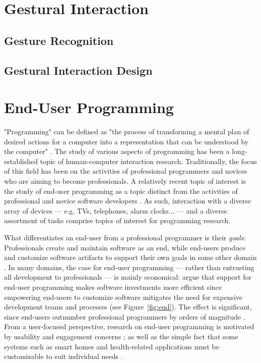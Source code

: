 \section{Gestural Interaction}

\subsection{Gesture Recognition}

\subsection{Gestural Interaction Design}

\section{End-User Programming}
\label{sec:end-user-programming}

"Programming" can be defined as "the process of transforming a mental plan of desired actions for a computer into a representation that can be understood by the computer" \parencite{Myers:2006}. The study of various aspects of programming has been a long-established topic of human-computer interaction research. Traditionally, the focus of this field has been on the activities of professional programmers and novices who are aiming to become professionals. A relatively recent topic of interest is the study of end-user programming as a topic distinct from the activities of professional and novice software developers \parencite{Myers:2006}. As such, interaction with a diverse array of devices --- e.g. TVs, telephones, alarm clocks... --- and a diverse assortment of tasks comprise topics of interest for programming research.

What differentiates an end-user from a professional programmer is their \emph{goals}: Professionals create and maintain software as an end, while end-users produce and customize software artifacts to support their own goals in some other domain \parencite{Ko:2011}. In many domains, the case for end-user programming --- rather than entrusting all development to professionals --- is mainly economical:  \textcite{Wulf:2004} argue that support for end-user programming makes software investments more efficient since empowering end-users to customize software mitigates the need for expensive development teams and processes (see Figure~\ref{fig:eud}). The effect is significant, since end-users outnumber professional programmers by orders of magnitude \parencite{Scaffidi:2005}. From a user-focused perspective, research on end-user programming is motivated by usability and engagement concerns \parencite{Germonprez:2007}; as well as the simple fact that some systems such as smart homes \parencite{Blackwell:2004} and health-related applications \parencite{Rizzo:2011, Lange:2011} must be customizable to suit individual needs \parencite{Holloway:2010}.

